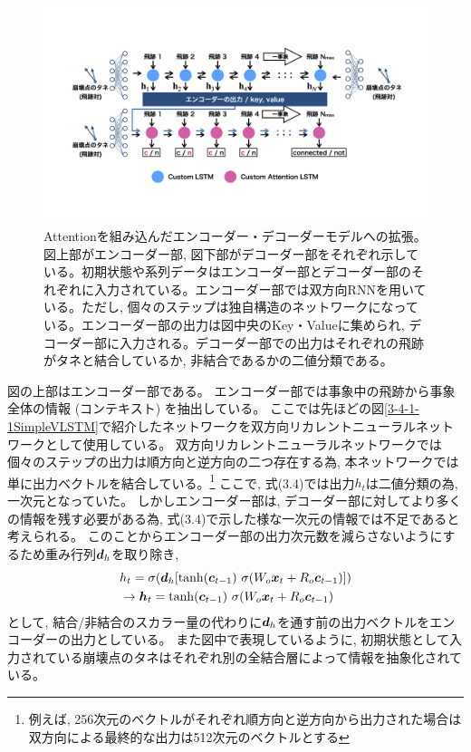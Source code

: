 \begin{figure}[htbp]
 \centering
 \includegraphics[trim = 100 200 100 100, width=1.0\textwidth, clip]{Figure/3Networks/3-4-1-4EncoderDecoderVLSTM.png}
 \caption[Attentionを組み込んだエンコーダー・デコーダーモデルへの拡張]{Attentionを組み込んだエンコーダー・デコーダーモデルへの拡張。図上部がエンコーダー部, 図下部がデコーダー部をそれぞれ示している。初期状態や系列データはエンコーダー部とデコーダー部のそれぞれに入力されている。エンコーダー部では双方向RNNを用いている。ただし, 個々のステップは独自構造のネットワークになっている。エンコーダー部の出力は図中央のKey・Valueに集められ, デコーダー部に入力される。デコーダー部での出力はそれぞれの飛跡がタネと結合しているか, 非結合であるかの二値分類である。}
 \label{3-4-1-4EncoderDecoderVLSTM}
\end{figure}

図の上部はエンコーダー部である。
エンコーダー部では事象中の飛跡から事象全体の情報 (コンテキスト) を抽出している。
ここでは先ほどの図\ref{3-4-1-1SimpleVLSTM}で紹介したネットワークを双方向リカレントニューラルネットワークとして使用している。
双方向リカレントニューラルネットワークでは個々のステップの出力は順方向と逆方向の二つ存在する為, 本ネットワークでは単に出力ベクトルを結合している。\footnote{例えば, 256次元のベクトルがそれぞれ順方向と逆方向から出力された場合は双方向による最終的な出力は512次元のベクトルとする}
ここで, 式(3.4)では出力$h_{t}$は二値分類の為, 一次元となっていた。
しかしエンコーダー部は, デコーダー部に対してより多くの情報を残す必要がある為, 式(3.4)で示した様な一次元の情報では不足であると考えられる。
このことからエンコーダー部の出力次元数を減らさないようにするため重み行列${\mbox{\boldmath{$d$}}}_h$を取り除き, 
\begin{equation}
 \begin{split}
  &h_{t} 
  = \sigma ({\mbox{\boldmath{$d$}}}_h [\tanh({\mbox{\boldmath{$c$}}}_{t-1}) \  \sigma (W_o {\mbox{\boldmath{$x$}}}_t + R_o {\mbox{\boldmath{$c$}}}_{t-1}) ])\\
  &\to {\mbox{\boldmath{$h$}}}_{t} 
  = \tanh({\mbox{\boldmath{$c$}}}_{t-1}) \  \sigma (W_o {\mbox{\boldmath{$x$}}}_t + R_o {\mbox{\boldmath{$c$}}}_{t-1})
 \end{split}
\end{equation}
として, 結合/非結合のスカラー量の代わりに${\mbox{\boldmath{$d$}}}_h$を通す前の出力ベクトルをエンコーダーの出力としている。
また図中で表現しているように, 初期状態として入力されている崩壊点のタネはそれぞれ別の全結合層によって情報を抽象化されている。\\


